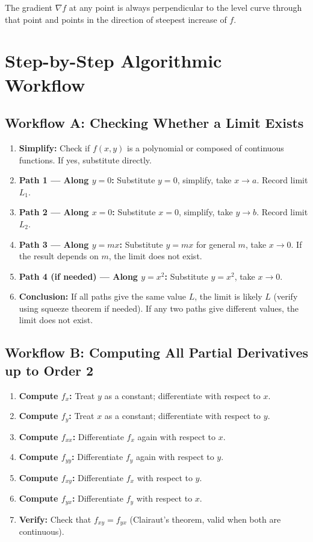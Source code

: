 \documentclass[12pt,a4paper]{article}
\begin{document}
The gradient \(\nabla f\) at any point is always perpendicular to the level curve through that point and points in the direction of steepest increase of \(f\).

\section{Step-by-Step Algorithmic Workflow}

\subsection*{Workflow A: Checking Whether a Limit Exists}

\begin{enumerate}
  \item \textbf{Simplify:} Check if \(f(x,y)\) is a polynomial or composed of continuous functions. If yes, substitute directly.
  \item \textbf{Path 1 --- Along \(y=0\):} Substitute \(y=0\), simplify, take \(x \to a\). Record limit \(L_1\).
  \item \textbf{Path 2 --- Along \(x=0\):} Substitute \(x=0\), simplify, take \(y \to b\). Record limit \(L_2\).
  \item \textbf{Path 3 --- Along \(y=mx\):} Substitute \(y=mx\) for general \(m\), take \(x \to 0\). If the result depends on \(m\), the limit does not exist.
  \item \textbf{Path 4 (if needed) --- Along \(y=x^2\):} Substitute \(y=x^2\), take \(x \to 0\).
  \item \textbf{Conclusion:} If all paths give the same value \(L\), the limit is likely \(L\) (verify using squeeze theorem if needed). If any two paths give different values, the limit does not exist.
\end{enumerate}

\subsection*{Workflow B: Computing All Partial Derivatives up to Order 2}

\begin{enumerate}
  \item \textbf{Compute \(f_x\):} Treat \(y\) as a constant; differentiate with respect to \(x\).
  \item \textbf{Compute \(f_y\):} Treat \(x\) as a constant; differentiate with respect to \(y\).
  \item \textbf{Compute \(f_{xx}\):} Differentiate \(f_x\) again with respect to \(x\).
  \item \textbf{Compute \(f_{yy}\):} Differentiate \(f_y\) again with respect to \(y\).
  \item \textbf{Compute \(f_{xy}\):} Differentiate \(f_x\) with respect to \(y\).
  \item \textbf{Compute \(f_{yx}\):} Differentiate \(f_y\) with respect to \(x\).
  \item \textbf{Verify:} Check that \(f_{xy} = f_{yx}\) (Clairaut's theorem, valid when both are continuous).
\end{enumerate}
\end{document}
